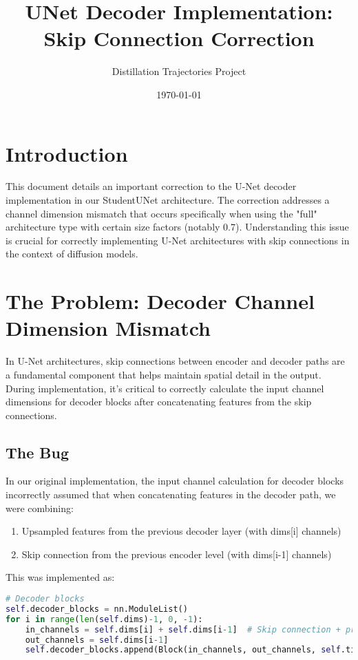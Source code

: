 \documentclass{article}
\title{UNet Decoder Implementation: Skip Connection Correction}
\author{Distillation Trajectories Project}
\date{\today}
\begin{document}
\maketitle

\section{Introduction}

This document details an important correction to the U-Net decoder implementation in our StudentUNet architecture. The correction addresses a channel dimension mismatch that occurs specifically when using the "full" architecture type with certain size factors (notably 0.7). Understanding this issue is crucial for correctly implementing U-Net architectures with skip connections in the context of diffusion models.

\section{The Problem: Decoder Channel Dimension Mismatch}

In U-Net architectures, skip connections between encoder and decoder paths are a fundamental component that helps maintain spatial detail in the output. During implementation, it's critical to correctly calculate the input channel dimensions for decoder blocks after concatenating features from the skip connections.

\subsection{The Bug}

In our original implementation, the input channel calculation for decoder blocks incorrectly assumed that when concatenating features in the decoder path, we were combining:

\begin{enumerate}
  \item Upsampled features from the previous decoder layer (with dims[i] channels)
  \item Skip connection from the previous encoder level (with dims[i-1] channels)
\end{enumerate}

This was implemented as:

\begin{lstlisting}[language=Python, frame=single]
# Decoder blocks
self.decoder_blocks = nn.ModuleList()
for i in range(len(self.dims)-1, 0, -1):
    in_channels = self.dims[i] + self.dims[i-1]  # Skip connection + previous layer
    out_channels = self.dims[i-1]
    self.decoder_blocks.append(Block(in_channels, out_channels, self.time_emb_dim))
\end{lstlisting}
\end{document}
